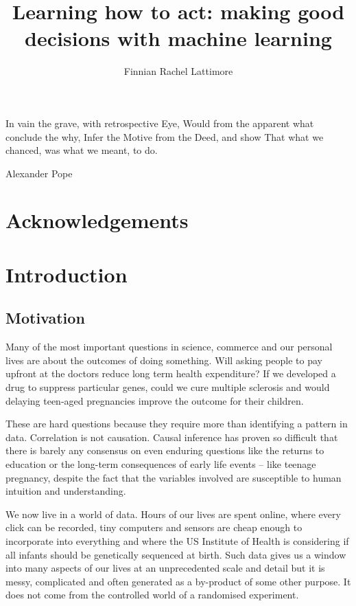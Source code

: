 \documentclass[11pt,a4paper,twoside]{report}
\author{Finnian Rachel Lattimore}
\title{Learning how to act: making good decisions with machine learning}
\theoremstyle{plain}
\theoremstyle{definition}
\newcommand{\ci}{\mathrel{\perp\mspace{-10mu}\perp}}
\begin{document}




\epigraph{In vain the grave, with retrospective Eye,
Would from the apparent what conclude the why,
Infer the Motive from the Deed, and show
That what we chanced, was what we meant, to do.}{Alexander Pope}

\chapter*{Acknowledgements}







\tableofcontents


\chapter{Introduction}

\section{Motivation}
Many of the most important questions in science, commerce and our personal lives are about the outcomes of doing something. Will asking people to pay upfront at the doctors reduce long term health expenditure? If we developed a drug to suppress particular genes, could we cure multiple sclerosis and would delaying teen-aged pregnancies improve the outcome for their children.  

These are hard questions because they require more than identifying a pattern in data. Correlation is not causation. Causal inference has proven so difficult that there is barely any consensus on even enduring questions like the returns to education or the long-term consequences of early life events – like teenage pregnancy, despite the fact that the variables involved are susceptible to human intuition and understanding. 

We now live in a world of data. Hours of our lives are spent online, where every click can be recorded, tiny computers and sensors are cheap enough to incorporate into everything and where the US Institute of Health is considering if all infants should be genetically sequenced at birth. Such data gives us a window into many aspects of our lives at an unprecedented scale and detail but it is messy, complicated and often generated as a by-product of some other purpose. It does not come from the controlled world of a randomised experiment.
\end{document}
